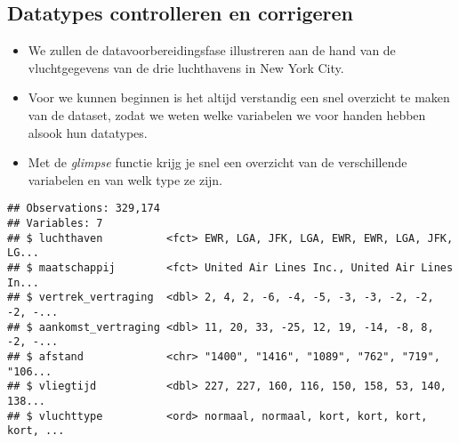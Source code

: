 \documentclass[]{memoir}
\providecommand{\tightlist}{%
  \setlength{\itemsep}{0pt}\setlength{\parskip}{0pt}}
\begin{document}
\subsection{Datatypes controlleren en
corrigeren}\label{datatypes-controlleren-en-corrigeren}

\begin{itemize}
\tightlist
\item
  We zullen de datavoorbereidingsfase illustreren aan de hand van de
  vluchtgegevens van de drie luchthavens in New York City.
\item
  Voor we kunnen beginnen is het altijd verstandig een snel overzicht te
  maken van de dataset, zodat we weten welke variabelen we voor handen
  hebben alsook hun datatypes.
\item
  Met de \emph{glimpse} functie krijg je snel een overzicht van de
  verschillende variabelen en van welk type ze zijn.
\end{itemize}

\begin{verbatim}
## Observations: 329,174
## Variables: 7
## $ luchthaven          <fct> EWR, LGA, JFK, LGA, EWR, EWR, LGA, JFK, LG...
## $ maatschappij        <fct> United Air Lines Inc., United Air Lines In...
## $ vertrek_vertraging  <dbl> 2, 4, 2, -6, -4, -5, -3, -3, -2, -2, -2, -...
## $ aankomst_vertraging <dbl> 11, 20, 33, -25, 12, 19, -14, -8, 8, -2, -...
## $ afstand             <chr> "1400", "1416", "1089", "762", "719", "106...
## $ vliegtijd           <dbl> 227, 227, 160, 116, 150, 158, 53, 140, 138...
## $ vluchttype          <ord> normaal, normaal, kort, kort, kort, kort, ...
\end{verbatim}
\end{document}
